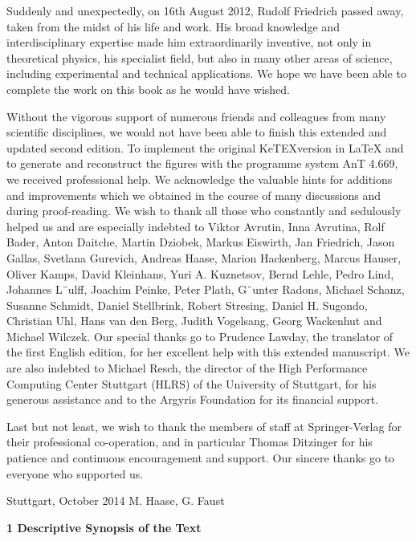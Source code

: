 \documentclass[12pt]{article}
\begin{document}
Suddenly and unexpectedly, on 16th August 2012, Rudolf Friedrich passed away,
taken from the midst of his life and work. His broad knowledge and interdisciplinary
expertise made him extraordinarily inventive, not only in theoretical physics, his
specialist field, but also in many other areas of science, including experimental and
technical applications. We hope we have been able to complete the work on this
book as he would have wished.

\hfill

Without the vigorous support of numerous friends and colleagues from many scientific
disciplines, we would not have been able to finish this extended and updated
second edition. To implement the original KeTEXversion in LaTeX and to generate
and reconstruct the figures with the programme system AnT 4.669, we received professional
help. We acknowledge the valuable hints for additions and improvements
which we obtained in the course of many discussions and during proof-reading.
We wish to thank all those who constantly and sedulously helped us and are especially
indebted to Viktor Avrutin, Inna Avrutina, Rolf Bader, Anton Daitche,
Martin Dziobek, Markus Eiswirth, Jan Friedrich, Jason Gallas, Svetlana Gurevich,
Andreas Haase, Marion Hackenberg, Marcus Hauser, Oliver Kamps, David
Kleinhans, Yuri A. Kuznetsov, Bernd Lehle, Pedro Lind, Johannes L¨ulff, Joachim
Peinke, Peter Plath, G¨unter Radons, Michael Schanz, Susanne Schmidt, Daniel
Stellbrink, Robert Stresing, Daniel H. Sugondo, Christian Uhl, Hans van den Berg,
Judith Vogelsang, Georg Wackenhut and Michael Wilczek. Our special thanks go
to Prudence Lawday, the translator of the first English edition, for her excellent
help with this extended manuscript. We are also indebted to Michael Resch, the
director of the High Performance Computing Center Stuttgart (HLRS) of the University
of Stuttgart, for his generous assistance and to the Argyris Foundation for its
financial support.

\hfill

Last but not least, we wish to thank the members of staff at Springer-Verlag for
their professional co-operation, and in particular Thomas Ditzinger for his patience
and continuous encouragement and support. Our sincere thanks go to everyone who
supported us.

\hfill

Stuttgart, October 2014 M. Haase, G. Faust

\hfill

\textbf{1 Descriptive Synopsis of the Text}
\end{document}
